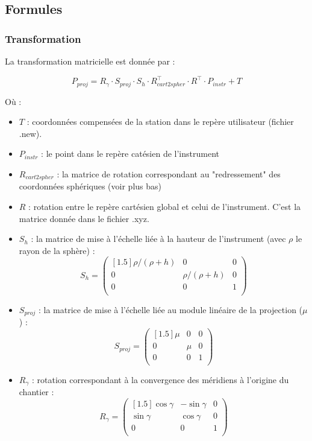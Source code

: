 \documentclass[french]{report}
\begin{document}
\subsection{Formules}


\subsubsection{Transformation}
La transformation matricielle est donnée par :

$$
 P_{proj} = R_{\gamma} \cdot S_{proj} \cdot S_h \cdot R_{cart2spher}^\top \cdot R^\top \cdot P_{instr} + T
$$

Où :

\begin{itemize}
  \item  $T$ : coordonnées compensées de la station dans le repère utilisateur (fichier .new).
  \item  $P_{instr}$ : le point dans le repère catésien de l'instrument
  \item  $R_{cart2spher}$ : la matrice de rotation correspondant au "redressement" des coordonnées sphériques (voir plus bas)
  \item  $R$ : rotation entre le repère cartésien global et celui de l'instrument. C'est la matrice donnée dans le fichier .xyz.
  \item  $S_h$ : la matrice de mise à l'échelle liée à la hauteur de l'instrument (avec $\rho$ le rayon de la sphère) :
$$S_h=\begin{pmatrix}[1.5]
\rho/(\rho+h) & 0 &  0 \\
0 & \rho/(\rho+h) & 0 \\
 0 &  0 & 1 \\
\end{pmatrix}$$

  \item  $S_{proj}$ : la matrice de mise à l'échelle liée au module linéaire de la projection ($\mu$) :
$$S_{proj}=\begin{pmatrix}[1.5]
\mu & 0 &  0 \\
0 & \mu & 0 \\
 0 &  0 & 1 \\
 \end{pmatrix}$$
  \item $R_{\gamma}$ : rotation correspondant à la convergence des méridiens à l'origine du chantier :
$$R_{\gamma}=\begin{pmatrix}[1.5]
\cos{\gamma} & -\sin{\gamma} &  0 \\
\sin{\gamma} & \cos{\gamma} & 0 \\
 0 &  0 & 1 \\
\end{pmatrix}$$


\end{itemize}
\end{document}
